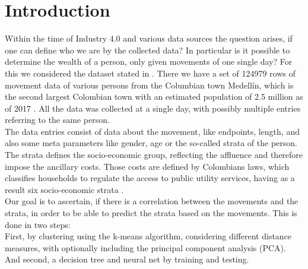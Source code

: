 \section{Introduction} \label{sec: introduction}
	Within the time of Industry 4.0 and various data sources the question arises, if one can define who we are by the collected data? In particular is it possible to determine the wealth of a person, only given movements of one single day?
	For this we considered the dataset stated in \cite{rich_do_not_rise_early}. There we have a set of 124979 rows of movement data of various persons from the Columbian town Medellín, which is the second largest Colombian town with an estimated population of 2.5 million as of 2017 \cite{population_number} . All the data was collected at a single day, with possibly multiple entries referring to the same person.\\
	The data entries consist of data about the movement, like endpoints, length, and also some meta parameters like gender, age or the so-called strata of the person. The strata defines the socio-economic group, reflecting the affluence and therefore impose the ancillary costs. Those costs are defined by Colombians laws, which classifies households to regulate the access to public utility services, having as a result six socio-economic strata \cite{rich_do_not_rise_early}.\\
	Our goal is to ascertain, if there is a correlation between the movements and the strata, in order to be able to predict the strata based on the movements. This is done in two steps:\\
	First, by clustering using the k-means algorithm, considering different distance measures, with optionally including the principal component analysis (PCA).\\
	And second, a decision tree and neural net by training and testing.